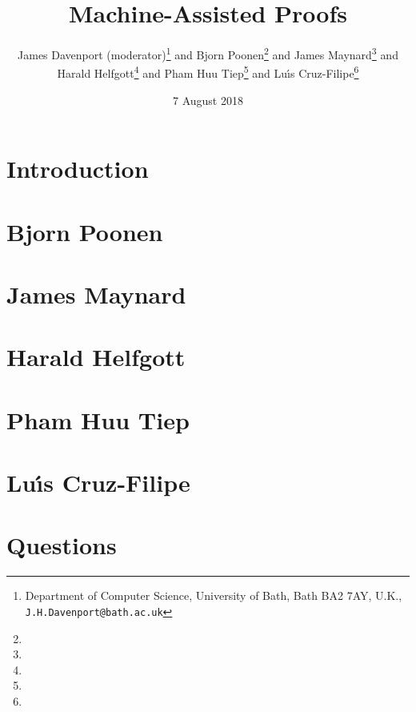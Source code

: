 \documentclass{article}
\begin{document}
\title{Machine-Assisted Proofs}
\author{James Davenport (moderator)\footnote{Department of Computer Science, University of Bath, Bath BA2 7AY, U.K., {\tt J.H.Davenport@bath.ac.uk}}{ } and Bjorn Poonen\footnote{}{ } and James Maynard\footnote{}{ } and \\Harald Helfgott\footnote{}{ } and Pham Huu Tiep\footnote{}{ } and Lu\'\i{}s Cruz-Filipe\footnote{}}
\date{7 August 2018}
\maketitle
\section{Introduction}

\section{Bjorn Poonen}

\section{James Maynard}

\section{Harald Helfgott}

\section{Pham Huu Tiep}

\section{Lu\'\i{}s Cruz-Filipe}

\section{Questions}


\end{document}
